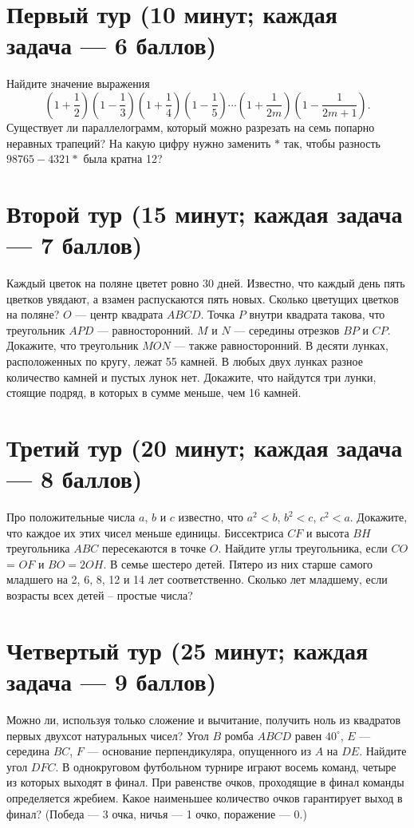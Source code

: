\documentclass[a4paper,12pt]{article}
\begin{document}
    
    \section{Первый тур (10 минут; каждая задача --- 6 баллов)}
    \problem Найдите значение выражения
    \begin{equation*}
        \left(1 + \frac{1}{2}\right) \left(1 - \frac{1}{3}\right) \left(1 + \frac{1}{4}\right) \left(1 - \frac{1}{5}\right) \cdots \left(1 + \frac{1}{2m}\right) \left(1 - \frac{1}{2m + 1}\right).
    \end{equation*}
    \problem Существует ли параллелограмм, который можно разрезать на семь попарно неравных трапеций?
    \problem На какую цифру нужно заменить $*$ так, чтобы разность $98765 - 4321*$ была кратна 12?
    
    \section{Второй тур (15 минут; каждая задача --- 7 баллов)}
    \problem Каждый цветок на поляне цветет ровно 30 дней. Известно, что каждый день пять цветков увядают, а взамен распускаются пять новых. Сколько цветущих цветков на поляне?
    \problem $O$ --- центр квадрата $ABCD$. Точка $P$ внутри квадрата такова, что треугольник $APD$ --- равносторонний. $M$ и $N$ --- середины отрезков $BP$ и $CP$. Докажите, что треугольник $MON$ --- также равносторонний.
    \problem В десяти лунках, расположенных по кругу, лежат 55 камней. В любых двух лунках разное количество камней и пустых лунок нет. Докажите, что найдутся три лунки, стоящие подряд, в которых в сумме меньше, чем 16 камней.
    
    \section{Третий тур (20 минут; каждая задача --- 8 баллов)}
    \problem Про положительные числа $a$, $b$ и $c$ известно, что $a^2 < b$, $b^2 < c$, $c^2 < a$. Докажите, что каждое их этих чисел меньше единицы.
    \problem Биссектриса $CF$ и высота $BH$ треугольника $ABC$ пересекаются в точке $O$. Найдите углы треугольника, если $CO$ = $OF$ и $BO = 2OH$.
    \problem В семье шестеро детей. Пятеро из них старше самого младшего на 2, 6, 8, 12 и 14 лет соответственно. Сколько лет младшему, если возрасты всех детей – простые числа?
    
    \section{Четвертый тур (25 минут; каждая задача --- 9 баллов)}
    \problem Можно ли, используя только сложение и вычитание, получить ноль из квадратов первых двухсот натуральных чисел?
    \problem Угол $B$ ромба $ABCD$ равен $40^\circ$, $E$ --- середина $BC$, $F$ --- основание перпендикуляра, опущенного из $A$ на $DE$. Найдите угол $DFC$.
    \problem В однокруговом футбольном турнире играют восемь команд, четыре из которых выходят в финал. При равенстве очков, проходящие в финал команды определяется жребием. Какое наименьшее количество очков гарантирует выход в финал? (Победа --- 3 очка, ничья --- 1 очко, поражение --- 0.)
\end{document}
